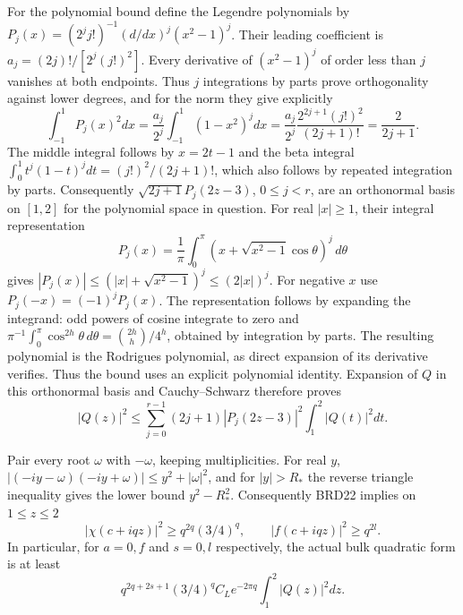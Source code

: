 For the polynomial bound define the Legendre polynomials by
$P_j(x)=(2^j j!)^{-1}(d/dx)^j(x^2-1)^j$.
Their leading coefficient is
$a_j=(2j)!/[2^j(j!)^2]$. Every derivative of $(x^2-1)^j$
of order less than $j$ vanishes at both endpoints. Thus
$j$ integrations by parts prove orthogonality against lower
degrees, and for the norm they give explicitly
\[
 \int_{-1}^1P_j(x)^2dx
  =\frac{a_j}{2^j}\int_{-1}^1(1-x^2)^jdx
  =\frac{a_j}{2^j}
       \frac{2^{2j+1}(j!)^2}{(2j+1)!}
  =\frac2{2j+1}.
\]
The middle integral follows by $x=2t-1$ and the beta integral
$\int_0^1t^j(1-t)^jdt=(j!)^2/(2j+1)!$, which also follows
by repeated integration by parts. Consequently
$\sqrt{2j+1}P_j(2z-3)$, $0\leq j<r$, are an orthonormal
basis on $[1,2]$ for the polynomial space in question. For
real $|x|\geq1$, their integral representation
\[
 P_j(x)=\frac1\pi\int_0^\pi
            (x+\sqrt{x^2-1}\cos\theta)^j\,d\theta
\tag{BRD25}
\]
gives $|P_j(x)|\leq(|x|+\sqrt{x^2-1})^j\leq(2|x|)^j$.
For negative $x$ use $P_j(-x)=(-1)^jP_j(x)$.
The representation follows by expanding the integrand: odd
powers of cosine integrate to zero and
$\pi^{-1}\int_0^\pi\cos^{2h}\theta\,d\theta
=\binom{2h}{h}/4^h$, obtained by integration by parts.
The resulting polynomial is the Rodrigues polynomial, as
direct expansion of its derivative verifies. Thus the bound
uses an explicit polynomial identity.
Expansion of $Q$ in this orthonormal basis and Cauchy--Schwarz
therefore proves
\[
 |Q(z)|^2\leq
 \sum_{j=0}^{r-1}(2j+1)|P_j(2z-3)|^2
                      \int_1^2|Q(t)|^2dt.
\tag{BRD26}
\]

Pair every root $\omega$ with $-\omega$, keeping multiplicities.
For real $y$,
$|(-iy-\omega)(-iy+\omega)|\leq y^2+|\omega|^2$,
and for $|y|>R_*$ the reverse triangle inequality gives the
lower bound $y^2-R_*^2$. Consequently BRD22 implies on $1\leq z\leq2$
\[
 |\chi(c+iqz)|^2\geq q^{2q}(3/4)^q,
 \qquad |f(c+iqz)|^2\geq q^{2l}.
\tag{BRD27}
\]
In particular, for $a=0,f$ and $s=0,l$ respectively, the actual
bulk quadratic form is at least
\[
 q^{2q+2s+1}(3/4)^q C_Le^{-2\pi q}
                           \int_1^2|Q(z)|^2dz.
\tag{BRD28}
\]

